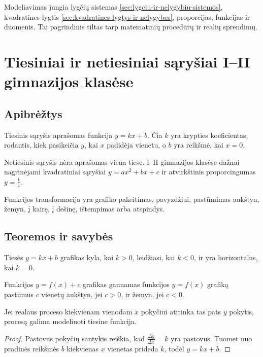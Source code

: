 Modeliavimas jungia lygčių sistemas \ref{sec:lygciu-ir-nelygybiu-sistemos}, kvadratines lygtis \ref{sec:kvadratines-lygtys-ir-nelygybes}, proporcijas, funkcijas ir duomenis. Tai pagrindinis tiltas tarp matematinių procedūrų ir realių sprendimų.

\section{Tiesiniai ir netiesiniai sąryšiai I--II gimnazijos klasėse}\label{sec:tiesiniai-ir-netiesiniai-sarysiai-9-10}

\subsection{Apibrėžtys}

\begin{apibreztis}
Tiesinis sąryšis aprašomas funkcija $y=kx+b$. Čia $k$ yra krypties koeficientas, rodantis, kiek pasikeičia $y$, kai $x$ padidėja vienetu, o $b$ yra reikšmė, kai $x=0$.
\end{apibreztis}

\begin{apibreztis}
Netiesinis sąryšis nėra aprašomas viena tiese. I--II gimnazijos klasėse dažnai nagrinėjami kvadratiniai sąryšiai $y=ax^2+bx+c$ ir atvirkštinis proporcingumas $y=\frac{k}{x}$.
\end{apibreztis}

\begin{apibreztis}
Funkcijos transformacija yra grafiko pakeitimas, pavyzdžiui, pastūmimas aukštyn, žemyn, į kairę, į dešinę, ištempimas arba atspindys.
\end{apibreztis}

\subsection{Teoremos ir savybės}

\begin{savybe}
Tiesės $y=kx+b$ grafikas kyla, kai $k>0$, leidžiasi, kai $k<0$, ir yra horizontalus, kai $k=0$.
\end{savybe}

\begin{savybe}
Funkcijos $y=f(x)+c$ grafikas gaunamas funkcijos $y=f(x)$ grafiką pastūmus $c$ vienetų aukštyn, jei $c>0$, ir žemyn, jei $c<0$.
\end{savybe}

\begin{teorema}
Jei realaus proceso kiekvienam vienodam $x$ pokyčiui atitinka tas pats $y$ pokytis, procesą galima modeliuoti tiesine funkcija.
\end{teorema}
\begin{proof}
Pastovus pokyčių santykis reiškia, kad $\frac{\Delta y}{\Delta x}=k$ yra pastovus. Tuomet nuo pradinės reikšmės $b$ kiekvienas $x$ vienetas prideda $k$, todėl $y=kx+b$.
\end{proof}

